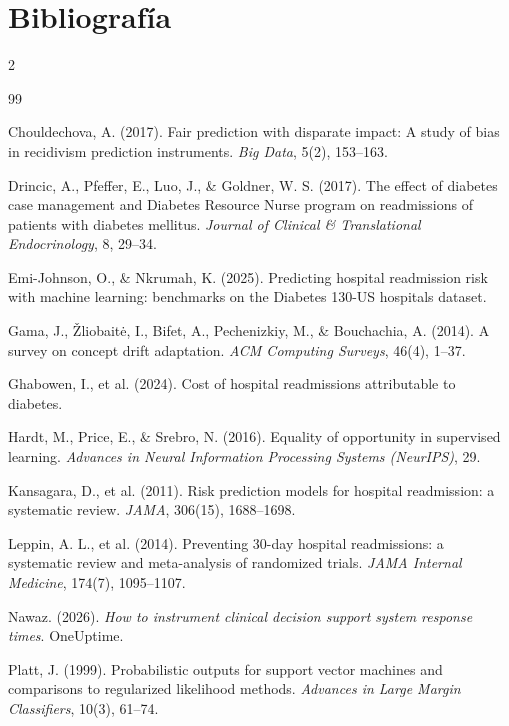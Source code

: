 \documentclass[11pt,a4paper]{article}
\begin{document}
\section*{Bibliografía}

{\footnotesize
\begin{multicols}{2}
\begin{thebibliography}{99}

 Chouldechova, A. (2017). Fair prediction with disparate impact: A study of bias in recidivism prediction instruments. \emph{Big Data}, 5(2), 153--163.

 Drincic, A., Pfeffer, E., Luo, J., \& Goldner, W. S. (2017). The effect of diabetes case management and Diabetes Resource Nurse program on readmissions of patients with diabetes mellitus. \emph{Journal of Clinical \& Translational Endocrinology}, 8, 29--34.

 Emi-Johnson, O., \& Nkrumah, K. (2025). Predicting hospital readmission risk with machine learning: benchmarks on the Diabetes 130-US hospitals dataset.

 Gama, J., Žliobaitė, I., Bifet, A., Pechenizkiy, M., \& Bouchachia, A. (2014). A survey on concept drift adaptation. \emph{ACM Computing Surveys}, 46(4), 1--37.

 Ghabowen, I., et al. (2024). Cost of hospital readmissions attributable to diabetes.

 Hardt, M., Price, E., \& Srebro, N. (2016). Equality of opportunity in supervised learning. \emph{Advances in Neural Information Processing Systems (NeurIPS)}, 29.

 Kansagara, D., et al. (2011). Risk prediction models for hospital readmission: a systematic review. \emph{JAMA}, 306(15), 1688--1698.

 Leppin, A. L., et al. (2014). Preventing 30-day hospital readmissions: a systematic review and meta-analysis of randomized trials. \emph{JAMA Internal Medicine}, 174(7), 1095--1107.

 Nawaz. (2026). \emph{How to instrument clinical decision support system response times}. OneUptime.

 Platt, J. (1999). Probabilistic outputs for support vector machines and comparisons to regularized likelihood methods. \emph{Advances in Large Margin Classifiers}, 10(3), 61--74.


\end{thebibliography}
\end{multicols}}
\end{document}

